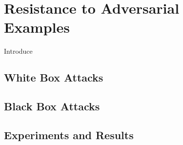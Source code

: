 \section{Resistance to Adversarial Examples}
\paragraph{}
Introduce 
\subsection{White Box Attacks}

\subsection{Black Box Attacks}

\subsection{Experiments and Results}